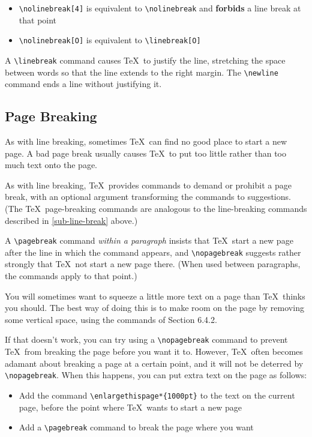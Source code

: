 \documentclass{article}
\newcommand{\justtext}[1]{\texttt{\textbackslash #1}}
\begin{document}
\begin{itemize}
   
   \item \justtext{nolinebreak[4]} is equivalent to \justtext{nolinebreak} and \textbf{forbids} a line break at that point
   
   \item \justtext{nolinebreak[O]} is equivalent to \justtext{linebreak[O]}
\end{itemize}

A \justtext{linebreak} command causes \TeX\ to justify the line, stretching the space between words so that the line extends to the right margin. The \justtext{newline} command ends a line without justifying it.

\subsection{Page Breaking}

As with line breaking, sometimes \TeX\ can find no good place to start a new page. A bad page break
usually causes \TeX\ to put too little rather than too much text onto the page.

As with line breaking, \TeX\ provides commands to demand or prohibit a page break, with an optional
argument transforming the commands to suggestions. (The \TeX\ page-breaking commands are analogous
to the line-breaking commands described in \ref{sub-line-break} above.)

A \justtext{pagebreak} command \emph{within a paragraph} insists that \TeX\ start a new page after
the line in which the command appears, and \justtext{nopagebreak} suggests rather strongly
that \TeX\ not start a new page there. (When used between paragraphs, the commands apply to that
point.)

You will sometimes want to squeeze a little more text on a page than \TeX\ thinks you should. The
best way of doing this is to make room on the page by removing some vertical space, using the
commands of Section 6.4.2.

If that doesn't work, you can try using a \justtext{nopagebreak} command to prevent \TeX\ from
breaking the page before you want it to. However, \TeX\ often becomes adamant about breaking a page
at a certain point, and it will not be deterred by \justtext{nopagebreak}. When this happens, you
can put extra text on the page as follows:

\begin{itemize}
   \item Add the command \justtext{enlargethispage*\{1000pt\}} to the text on the current page,
    before the point where \TeX\ wants to start a new page
   
   \item Add a \justtext{pagebreak} command to break the page where you want
\end{itemize}
\end{document}
